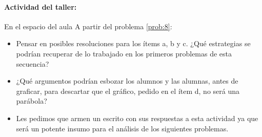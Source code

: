 \documentclass[oneside,spanish]{amsart}
\numberwithin{equation}{section}
\numberwithin{figure}{section}
\theoremstyle{definition}
\begin{document}
\paragraph{Actividad del taller:}

En el espacio del aula A partir del problema \ref{prob:8}:

\begin{itemize}
	\item Pensar en posibles resoluciones para los ítems a, b y c. ¿Qué estrategias se podrían recuperar de lo trabajado en los primeros problemas de esta secuencia? 
	\item ¿Qué argumentos podrían esbozar los alumnos y las alumnas, antes de graficar, para descartar que el gráfico, pedido en el ítem d, no será una parábola?
	\item Les pedimos que armen un escrito con sus respuestas a esta actividad ya que será un potente insumo para el análisis de los siguientes problemas.
\end{itemize}
\end{document}
